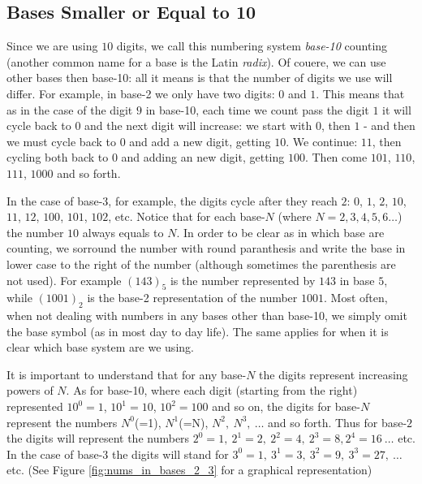 \subsection{Bases Smaller or Equal to 10}
Since we are using $10$ digits, we call this numbering system \textit{base-10} counting (another common name for a base is the Latin \textit{radix}). Of couere, we can use other bases then base-10: all it means is that the number of digits we use will differ. For example, in base-2 we only have two digits: $0$ and $1$. This means that as in the case of the digit $9$ in base-10, each time we count pass the digit $1$ it will cycle back to $0$ and the next digit will increase: we start with $0$, then $1$ - and then we must cycle back to $0$ and add a new digit, getting $10$. We continue: $11$, then cycling both back to $0$ and adding an new digit, getting $100$. Then come $101$, $110$, $111$, $1000$ and so forth. \par

In the case of base-3, for example, the digits cycle after they reach $2$: $0$, $1$, $2$, $10$, $11$, $12$, $100$, $101$, $102$, etc. Notice that for each base-$N$ (where $N=2,3,4,5,6\dots$) the number $10$ always equals to $N$. In order to be clear as in which base are counting, we sorround the number with round paranthesis and write the base in lower case to the right of the number (although sometimes the parenthesis are not used). For example $\left(143\right)_{5}$ is the number represented by $143$ in base $5$, while $\left(1001\right)_{2}$ is the base-2 representation of the number $1001$. Most often, when not dealing with numbers in any bases other than base-10, we simply omit the base symbol (as in most day to day life). The same applies for when it is clear which base system are we using.

It is important to understand that for any base-$N$ the digits represent increasing powers of $N$. As for base-10, where each digit (starting from the right) represented $10^{0}=1$, $10^{1}=10$, $10^{2}=100$ and so on, the digits for base-$N$ represent the numbers $N^{0}$(=1), $N^{1}$(=N), $N^{2},\ N^{3},\ \dots$ and so forth. Thus for base-$2$ the digits will represent the numbers $2^{0}=1,\ 2^{1}=2,\ 2^{2}=4,\ 2^{3}=8, 2^{4}=16\ \dots$ etc. In the case of base-$3$ the digits will stand for $3^{0}=1,\ 3^{1}=3,\ 3^{2}=9,\ 3^{3}=27,\ \dots$ etc. (See Figure \ref{fig:nums_in_bases_2_3} for a graphical representation) \par

